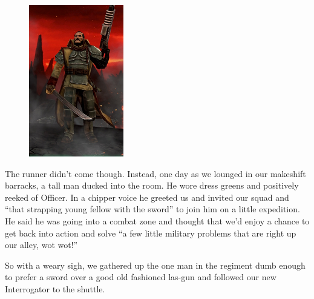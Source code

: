 \begin{figure}
\begin{center}
	\includegraphics[width=\figwidth]{pics/3/31.png}
\end{center}
\end{figure}
The runner didn’t come though. 
Instead, one day as we lounged in our makeshift barracks, a tall man ducked into the room. 
He wore dress greens and positively reeked of Officer. 
In a chipper voice he greeted us and invited our squad and “that strapping young fellow with the sword” to join him on a little expedition. 
He said he was going into a combat zone and thought that we’d enjoy a chance to get back into action and solve “a few little military problems that are right up our alley, wot wot!”

So with a weary sigh, we gathered up the one man in the regiment dumb enough to prefer a sword over a good old fashioned las-gun and followed our new Interrogator to the shuttle.











